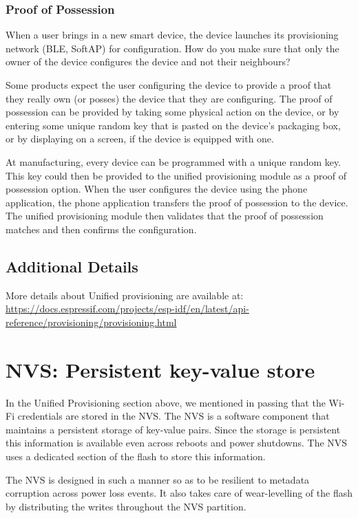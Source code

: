 \documentclass[main.tex]{subfiles}
\begin{document}
\subsubsection{Proof of Possession}

When a user brings in a new smart device, the device launches its provisioning network (BLE, SoftAP) for configuration.  How do you make sure that only the owner of the device configures the device and not their neighbours?

Some products expect the user configuring the device to provide a proof that they really own (or posses) the device that they are configuring. The proof of possession can be provided by taking some physical action on the device, or by entering some unique random key that is pasted on the device's packaging box, or by displaying on a screen, if the device is equipped with one.

At manufacturing, every device can be programmed with a unique random key. This key could then be provided to the unified provisioning module as a proof of possession option. When the user configures the device using the phone application, the phone application transfers the proof of possession to the device. The unified provisioning module then validates that the proof of possession matches and then confirms the configuration.

\subsection{Additional Details}

More details about Unified provisioning are available at: \url{https://docs.espressif.com/projects/esp-idf/en/latest/api-reference/provisioning/provisioning.html}

\section{NVS: Persistent key-value store}\label{sec:nvs_info}
In the Unified Provisioning section above, we mentioned in passing that the Wi-Fi credentials are stored in the NVS. The NVS is a software component that maintains a persistent storage of key-value pairs. Since the storage is persistent this information is available even across reboots and power shutdowns. The NVS uses a dedicated section of the flash to store this information.

The NVS is designed in such a manner so as to be resilient to metadata corruption across power loss events. It also takes care of wear-levelling of the flash by distributing the writes throughout the NVS partition.
\end{document}
